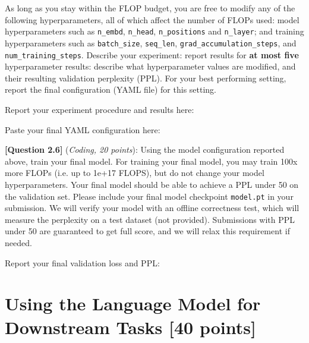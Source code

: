 \documentclass[leqno,12pt]{article}
\begin{document}
As long as you stay within the FLOP budget, you are free to modify any of the following hyperparameters, all of which affect the number of FLOPs used: model hyperparameters such as \texttt{n\_embd}, \texttt{n\_head}, \texttt{n\_positions} and \texttt{n\_layer}; and training hyperparameters such as \texttt{batch\_size}, \texttt{seq\_len}, \texttt{grad\_accumulation\_steps}, and \texttt{num\_training\_steps}.
%
Describe your experiment: report results for \textbf{at most five} hyperparameter results: describe what hyperparameter values are modified, and their resulting validation perplexity (PPL). For your best performing setting, report the final configuration (YAML file) for this setting.
\newline

\noindent
Report your experiment procedure and results here:
\begin{tcolorbox}[fit,height=7cm, width=\linewidth, blank, borderline={1pt}{-2pt}]
\end{tcolorbox}

\noindent
Paste your final YAML configuration here:
\begin{tcolorbox}[fit,height=3cm, width=\linewidth, blank, borderline={1pt}{-2pt}]
\end{tcolorbox}

\noindent \textbf{[Question 2.6]} (\emph{Coding, 20 points}): Using the model configuration reported above, train your final model. For training your final model, you may train 100x more FLOPs (i.e. up to 1e+17 FLOPS), but do not change your model hyperparameters. Your final model should be able to achieve a PPL under 50 on the validation set.
Please include your final model checkpoint \texttt{model.pt} in your submission. We will verify your model with an offline correctness test, which will measure the perplexity on a test dataset (not provided). Submissions with PPL under 50 are guaranteed to get full score, and we will relax this requirement if needed.

\noindent
Report your final validation loss and PPL:
\begin{tcolorbox}[fit,height=1cm, width=6cm, blank, borderline={1pt}{-2pt}]
\end{tcolorbox}

\section{Using the Language Model for Downstream Tasks [40 points]}
\end{document}
